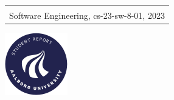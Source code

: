 \begin{titlepage}
{{\begin{tabular}{@{}p{\textwidth}@{}}
    \vspace{0.1cm}
   \begin{center}
    {\Large
      Christian Bager Bach Houmann, Daniel Overvad Nykjær, Ivik Lau Dalgas Hostrup, Marco Klaustrup Justesen, Patrick Frostholm Østergaard, Rasmus Høyer Hansen %
    }\\
    \vspace{0.2cm}
    {\large
      Software Engineering, cs-23-sw-8-01, 2023%
    }
   \end{center}
   \vspace{0.2cm}
   \begin{center}
    {\Large
      8th semester
    }
   \end{center}
  \end{tabular}}}
  \vfill
  \begin{center}
    \includegraphics[width=0.2\paperwidth]{AAUgraphics/aau_logo_circle_en}%
  \end{center}
\end{titlepage}
\clearpage
